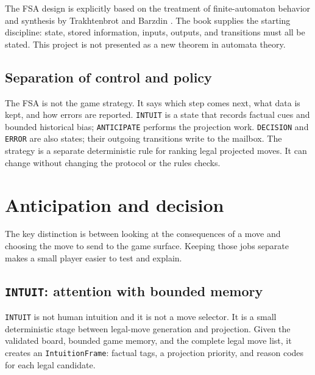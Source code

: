 \documentclass[11pt]{article}
\begin{document}
The FSA design is explicitly based on the treatment of finite-automaton
behavior and synthesis by Trakhtenbrot and Barzdin
\cite{trakhtenbrotBarzdin1973}. The book supplies the starting discipline:
state, stored information, inputs, outputs, and transitions must all be
stated. This project is not presented as a new theorem in automata theory.

\begin{center}
\end{center}

\subsection{Separation of control and policy}

The FSA is not the game strategy. It says which step comes next, what data is
kept, and how errors are reported. \texttt{INTUIT} is a state that records
factual cues and bounded historical bias; \texttt{ANTICIPATE} performs the
projection work. \texttt{DECISION} and \texttt{ERROR} are also states; their
outgoing transitions write to the mailbox. The strategy is a separate
deterministic rule for ranking legal projected moves. It can change without
changing the protocol or the rules checks.

\section{Anticipation and decision}

The key distinction is between looking at the consequences of a move and
choosing the move to send to the game surface. Keeping those jobs separate
makes a small player easier to test and explain.

\subsection{\texttt{INTUIT}: attention with bounded memory}

\texttt{INTUIT} is not human intuition and it is not a move selector. It is a
small deterministic stage between legal-move generation and projection. Given
the validated board, bounded game memory, and the complete legal move list, it
creates an \texttt{IntuitionFrame}: factual tags, a projection priority, and
reason codes for each legal candidate.
\end{document}
